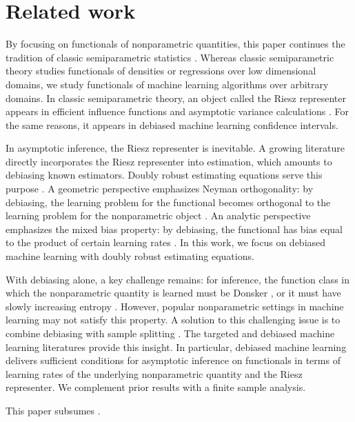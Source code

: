 \section{Related work}\label{sec:related_main}

By focusing on functionals of nonparametric quantities, this paper continues the tradition of classic semiparametric statistics \cite{hasminskii1979nonparametric,robinson1988root,bickel1993efficient,newey1994asymptotic,andrews1994asymptotics,robins1995semiparametric,ai2003efficient}. Whereas classic semiparametric theory studies functionals of densities or regressions over low dimensional domains, we study functionals of machine learning algorithms over arbitrary domains. %
In classic semiparametric theory, an object called the Riesz representer appears in efficient influence functions and asymptotic variance calculations \cite{newey1994asymptotic}. For the same reasons, it appears in debiased machine learning confidence intervals.

In asymptotic inference, the Riesz representer is inevitable. A growing literature directly incorporates the Riesz representer into estimation, which amounts to debiasing known estimators. Doubly robust estimating equations serve this purpose \cite{robins1995semiparametric}. A geometric perspective emphasizes Neyman orthogonality: by debiasing, the learning problem for the functional becomes orthogonal to the learning problem for the nonparametric object \cite{chernozhukov2016locally,chernozhukov2018original,foster2019orthogonal}. An analytic perspective emphasizes the mixed bias property: by debiasing, the functional has bias equal to the product of certain learning rates \cite{chernozhukov2018original,rotnitzky2021characterization}. In this work, we focus on debiased machine learning with doubly robust estimating equations.

With debiasing alone, a key challenge remains: for inference, the function class in which the nonparametric quantity is learned must be Donsker \cite{van2006targeted,luedtke2016statistical,van2018targeted,qiu2021universal}, or it must have slowly increasing entropy \cite{belloni2013inference,belloni2014uniform,zhang2014confidence,javanmard2014confidence,vandegeer2014asymptotically}. However, popular nonparametric settings in machine learning may not satisfy this property. A solution to this challenging issue is to combine debiasing with sample splitting \cite{klaassen1987consistent}. The targeted \cite{zheng2011cross}
and debiased \cite{belloni2012sparse,chernozhukov2016locally,chernozhukov2018original} machine learning literatures provide this insight. In particular, debiased machine learning delivers sufficient conditions for asymptotic inference on functionals in terms of learning rates of the underlying nonparametric quantity and the Riesz representer. We complement prior results with a finite sample analysis. 

This paper subsumes \cite[Section 4]{singh2021debiased}.
